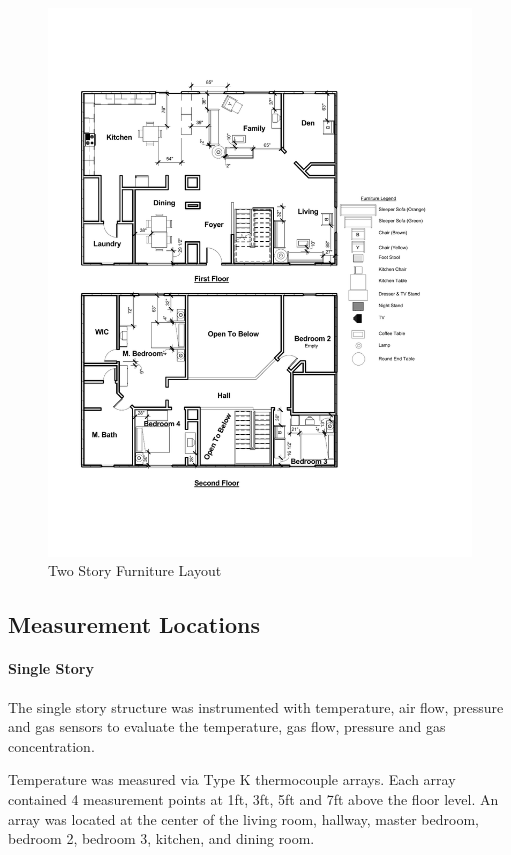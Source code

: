 \documentclass{article}
\begin{document}
\begin{figure}[H]
	\centering
	\includegraphics[width=\textwidth]{0_Images/Furniture/Two_Story_Furniture_Layout.pdf}
	\caption{Two Story Furniture Layout}
	\label{fig:TwoStoryFurniture}
\end{figure}

\subsection{Measurement Locations}

\paragraph{Single Story} \mbox{}
The single story structure was instrumented with temperature, air flow, pressure and gas sensors to evaluate the temperature, gas flow, pressure and gas concentration. 

Temperature was measured via Type K thermocouple arrays. Each array contained 4 measurement points at 1ft, 3ft, 5ft and 7ft above the floor level. An array was located at the center of the living room, hallway, master bedroom, bedroom 2, bedroom 3, kitchen, and dining room.    
\end{document}
